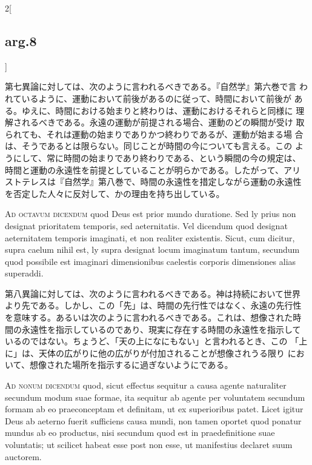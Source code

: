 \documentclass[paper=a4paper,fontsize=10pt,jafontsize=9pt,titlepage]{jlreq}
\begin{document}
\begin{paracol}{2}[\subsection{arg.8}]
\switchcolumn


第七異論に対しては、次のように言われるべきである。『自然学』第六巻で言
われているように、運動において前後があるのに従って、時間において前後が
ある。ゆえに、時間における始まりと終わりは、運動におけるそれらと同様に
理解されるべきである。永遠の運動が前提される場合、運動のどの瞬間が受け
取られても、それは運動の始まりでありかつ終わりであるが、運動が始まる場
合は、そうであるとは限らない。同じことが時間の今についても言える。この
ようにして、常に時間の始まりであり終わりである、という瞬間の今の規定は、
時間と運動の永遠性を前提としていることが明らかである。したがって、アリ
ストテレスは『自然学』第八巻で、時間の永遠性を措定しながら運動の永遠性
を否定した人々に反対して、かの理由を持ち出している。


\switchcolumn*[\subsection{ad.8}]


{\scshape Ad octavum dicendum} quod Deus est prior mundo duratione. Sed ly prius
 non designat prioritatem temporis, sed aeternitatis. Vel dicendum quod
 designat aeternitatem temporis imaginati, et non realiter
 existentis. Sicut, cum dicitur, supra caelum nihil est, ly supra
 designat locum imaginatum tantum, secundum quod possibile est imaginari
 dimensionibus caelestis corporis dimensiones alias superaddi.


\switchcolumn


第八異論に対しては、次のように言われるべきである。神は持続において世界
より先である。しかし、この「先」は、時間の先行性ではなく、永遠の先行性
を意味する。あるいは次のように言われるべきである。これは、想像された時
間の永遠性を指示しているのであり、現実に存在する時間の永遠性を指示して
いるのではない。ちょうど、「天の上になにもない」と言われるとき、この
「上に」は、天体の広がりに他の広がりが付加されることが想像されうる限り
において、想像された場所を指示するに過ぎないようにである。


\switchcolumn*[\subsection{ad.9}]


{\scshape Ad nonum dicendum} quod, sicut effectus sequitur a causa agente
 naturaliter secundum modum suae formae, ita sequitur ab agente per
 voluntatem secundum formam ab eo praeconceptam et definitam, ut ex
 superioribus patet. Licet igitur Deus ab aeterno fuerit sufficiens
 causa mundi, non tamen oportet quod ponatur mundus ab eo productus,
 nisi secundum quod est in praedefinitione suae voluntatis; ut scilicet
 habeat esse post non esse, ut manifestius declaret suum auctorem.



\end{paracol}
\end{document}

